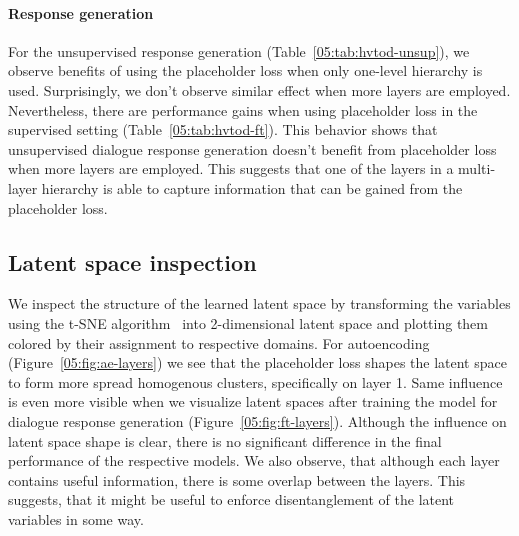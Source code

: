 \paragraph{Response generation}
For the unsupervised response generation (Table~\ref{05:tab:hvtod-unsup}), we observe benefits of using the placeholder loss when only one-level hierarchy is used.
Surprisingly, we don't observe similar effect when more layers are employed.
Nevertheless, there are performance gains when using placeholder loss in the supervised setting (Table~\ref{05:tab:hvtod-ft}).
This behavior shows that unsupervised dialogue response generation doesn't benefit from placeholder loss when more layers are employed.
This suggests that one of the layers in a multi-layer hierarchy is able to capture information that can be gained from the placeholder loss.

\subsection{Latent space inspection}
We inspect the structure of the learned latent space by transforming the variables using the t-SNE algorithm~\cite{van2008visualizing} into 2-dimensional latent space and plotting them colored by their assignment to respective domains.
For autoencoding (Figure~\ref{05:fig:ae-layers}) we see that the placeholder loss shapes the latent space to form more spread homogenous clusters, specifically on layer 1.
Same influence is even more visible when we visualize latent spaces after training the model for dialogue response generation (Figure~\ref{05:fig:ft-layers}).
Although the influence on latent space shape is clear, there is no significant difference in the final performance of the respective models.
We also observe, that although each layer contains useful information, there is some overlap between the layers.
This suggests, that it might be useful to enforce disentanglement of the latent variables in some way.

